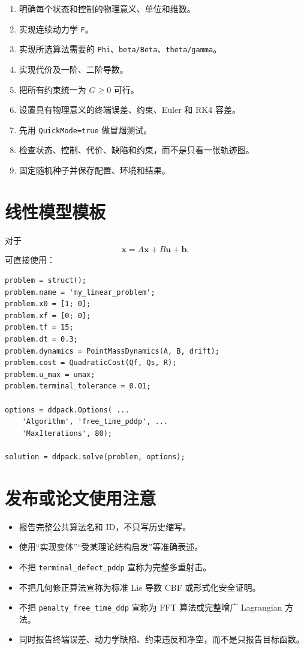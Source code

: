 \documentclass[UTF8,zihao=-4,openany,fontset=fandol]{ctexbook}
\newcommand{\code}[1]{\nolinkurl{#1}}
\begin{document}
\begin{enumerate}[leftmargin=2.4em]
  \item 明确每个状态和控制的物理意义、单位和维数。
  \item 实现连续动力学 \code{F}。
  \item 实现所选算法需要的
  \code{Phi}、\code{beta/Beta}、\code{theta/gamma}。
  \item 实现代价及一阶、二阶导数。
  \item 把所有约束统一为 $G\ge0$ 可行。
  \item 设置具有物理意义的终端误差、约束、Euler 和 RK4 容差。
  \item 先用 \code{QuickMode=true} 做冒烟测试。
  \item 检查状态、控制、代价、缺陷和约束，而不是只看一张轨迹图。
  \item 固定随机种子并保存配置、环境和结果。
\end{enumerate}

\section{线性模型模板}

对于
\[
  \dot{\bm{x}}=A\bm{x}+B\bm{u}+\bm{b},
\]
可直接使用：

\begin{lstlisting}
problem = struct();
problem.name = 'my_linear_problem';
problem.x0 = [1; 0];
problem.xf = [0; 0];
problem.tf = 15;
problem.dt = 0.3;
problem.dynamics = PointMassDynamics(A, B, drift);
problem.cost = QuadraticCost(Qf, Qs, R);
problem.u_max = umax;
problem.terminal_tolerance = 0.01;

options = ddpack.Options( ...
    'Algorithm', 'free_time_pddp', ...
    'MaxIterations', 80);

solution = ddpack.solve(problem, options);
\end{lstlisting}

\section{发布或论文使用注意}

\begin{itemize}[leftmargin=2em]
  \item 报告完整公共算法名和 ID，不只写历史缩写。
  \item 使用“实现变体”“受某理论结构启发”等准确表述。
  \item 不把 \code{terminal_defect_pddp} 宣称为完整多重射击。
  \item 不把几何修正算法宣称为标准 Lie 导数 CBF 或形式化安全证明。
  \item 不把 \code{penalty_free_time_ddp} 宣称为 FFT 算法或完整增广 Lagrangian 方法。
  \item 同时报告终端误差、动力学缺陷、约束违反和净空，而不是只报告目标函数。
\end{itemize}
\end{document}

